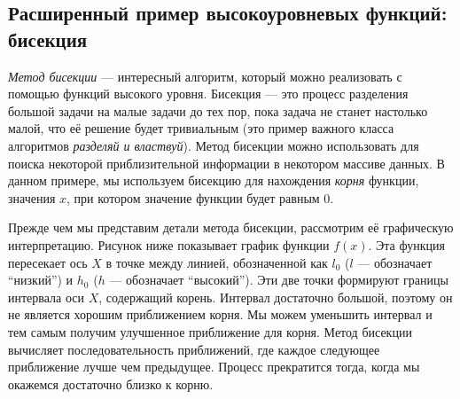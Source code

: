 
\subsection{Расширенный пример высокоуровневых функций: бисекция}\label{bisection}

\emph{Метод бисекции} --- интересный алгоритм, который можно реализовать с помощью функций высокого уровня. Бисекция --- это процесс разделения большой задачи на малые задачи до тех пор, пока задача не станет настолько малой, что её решение будет тривиальным (это пример важного класса алгоритмов \emph{разделяй и властвуй}). Метод бисекции можно использовать для поиска некоторой приблизительной информации в некотором массиве данных. В данном примере, мы используем бисекцию для нахождения \emph{корня} функции, значения $x$, при котором значение функции будет равным 0.

Прежде чем мы представим детали метода бисекции, рассмотрим её графическую интерпретацию. Рисунок ниже показывает график функции $f(x)$. Эта функция пересекает ось $X$ в точке между линией, обозначенной как $l_0$ ($l$ --- обозначает ``низкий'') и $h_0$ ($h$ --- обозначает ``высокий''). Эти две точки формируют границы интервала оси $X$, содержащий корень. Интервал достаточно большой, поэтому он не является хорошим приближением корня. Мы можем уменьшить интервал и тем самым получим улучшенное приближение для корня. Метод бисекции вычисляет последовательность приближений, где каждое следующее приближение лучше чем предыдущее. Процесс прекратится тогда, когда мы окажемся достаточно близко к корню.

